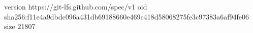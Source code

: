 version https://git-lfs.github.com/spec/v1
oid sha256:f11e4a9dbdc096a431db69188660e469c418d58068275fe3c97383a6af94fe06
size 21807
